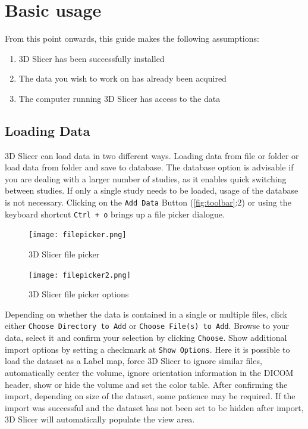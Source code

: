 \section{Basic usage}
\noindent
From this point onwards, this guide makes the following assumptions:
\begin{enumerate}
	\item 3D Slicer has been successfully installed
    \item The data you wish to work on has already been acquired
    \item The computer running 3D Slicer has access to the data
\end{enumerate}

\subsection{Loading Data}
3D Slicer can load data in two different ways.
Loading data from file or folder or load data from folder and save to database. %
The database option is advisable if you are dealing with a larger number of studies, as it enables quick switching between studies.
If only a single study needs to be loaded, usage of the database is not necessary.
Clicking on the \texttt{Add Data} Button (\ref{fig:toolbar}:2) or using the keyboard shortcut \texttt{Ctrl + o} brings up a file picker dialogue.
\begin{figure}[h!]
	\centerline{
		\texttt{[image: filepicker.png]}}
	\caption{3D Slicer file picker}
	\label{fig:filepicker}
  \end{figure}
  \begin{figure}[h!]
	\centerline{
		\texttt{[image: filepicker2.png]}}
	\caption{3D Slicer file picker options}
	\label{fig:filepicker2}
\end{figure}
\noindent
Depending on whether the data is contained in a single or multiple files, click either \texttt{Choose Directory to Add} or \texttt{Choose File(s) to Add}. Browse to your data, select it and confirm your selection by clicking \texttt{Choose}.
Show additional import options by setting a checkmark at \texttt{Show Options}.
Here it is possible to load the dataset as a Label map, force 3D Slicer to ignore similar files, automatically center the volume, ignore orientation information in the DICOM header, show or hide the volume and set the color table.
After confirming the import, depending on size of the dataset, some patience may be required. If the import was successful and the dataset has not been set to be hidden after import, 3D Slicer will automatically populate the view area.


